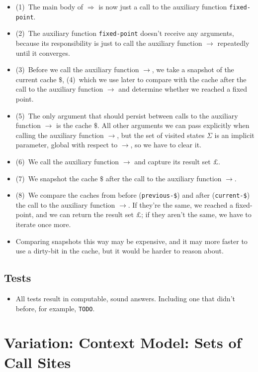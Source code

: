 \documentclass[12pt, oneside]{book}
\begin{document}
\begin{itemize}
  \item (1)~The main body of \(⇒\) is now just a call to the auxiliary function \texttt{fixed-point}.
  \item (2)~The auxiliary function \texttt{fixed-point} doesn’t receive any arguments, because its responsibility is just to call the auxiliary function \(→\) repeatedly until it converges.
  \item (3)~Before we call the auxiliary function \(→\), we take a snapshot of the current cache \(\$\), (4)~which we use later to compare with the cache after the call to the auxiliary function \(→\) and determine whether we reached a fixed point.
  \item (5)~The only argument that should persist between calls to the auxiliary function \(→\) is the cache \(\$\). All other arguments we can pass explicitly when calling the auxiliary function \(→\), but the set of visited states \(Σ\) is an implicit parameter, global with respect to \(→\), so we have to clear it.
  \item (6)~We call the auxiliary function \(→\) and capture its result set \(£\).
  \item (7)~We snapshot the cache \(\$\) after the call to the auxiliary function \(→\).
  \item (8)~We compare the caches from before (\texttt{previous-\$}) and after (\texttt{current-\$}) the call to the auxiliary function \(→\). If they’re the same, we reached a fixed-point, and we can return the result set \(£\); if they aren’t the same, we have to iterate once more.
  \item Comparing snapshots this way may be expensive, and it may more faster to use a dirty-bit in the cache, but it would be harder to reason about.
\end{itemize}

\subsection{Tests}

\begin{itemize}
  \item All tests result in computable, sound answers. Including one that didn’t before, for example, \texttt{TODO}.
\end{itemize}

\section{Variation: Context Model: Sets of Call Sites}
\label{section:variation--context-model--sets-of-call-sites}
\end{document}
